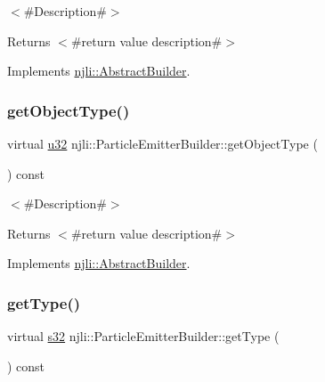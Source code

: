 $<$\#\+Description\#$>$

\begin{DoxyReturn}{Returns}
$<$\#return value description\#$>$ 
\end{DoxyReturn}


Implements \mbox{\hyperlink{classnjli_1_1_abstract_builder_a902f73ea78031b06aca183a417f3413b}{njli\+::\+Abstract\+Builder}}.

\mbox{\label{classnjli_1_1_particle_emitter_builder_aa38b8a6e823164153ee551be4349a1b5}} 
\subsubsection{\texorpdfstring{get\+Object\+Type()}{getObjectType()}}
{\footnotesize\ttfamily virtual \mbox{\hyperlink{_util_8h_a10e94b422ef0c20dcdec20d31a1f5049}{u32}} njli\+::\+Particle\+Emitter\+Builder\+::get\+Object\+Type (\begin{DoxyParamCaption}{ }\end{DoxyParamCaption}) const\hspace{0.3cm}{\ttfamily [virtual]}}

$<$\#\+Description\#$>$

\begin{DoxyReturn}{Returns}
$<$\#return value description\#$>$ 
\end{DoxyReturn}


Implements \mbox{\hyperlink{classnjli_1_1_abstract_builder_a0f2d344fcf697b167f4f2b1122b5fb33}{njli\+::\+Abstract\+Builder}}.

\mbox{\label{classnjli_1_1_particle_emitter_builder_a37c7ee24ecce61ba8d9cd71200339722}} 
\subsubsection{\texorpdfstring{get\+Type()}{getType()}}
{\footnotesize\ttfamily virtual \mbox{\hyperlink{_util_8h_aa62c75d314a0d1f37f79c4b73b2292e2}{s32}} njli\+::\+Particle\+Emitter\+Builder\+::get\+Type (\begin{DoxyParamCaption}{ }\end{DoxyParamCaption}) const\hspace{0.3cm}{\ttfamily [virtual]}}

